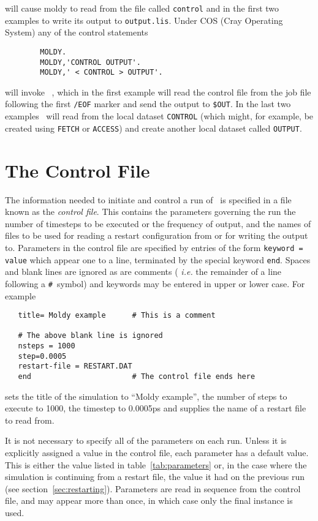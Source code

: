 will cause moldy to read from the file called \verb'control' and in
the first two examples to write its output to \verb'output.lis'.
Under COS (Cray Operating System) any of the control statements
\begin{verbatim}
        MOLDY.
        MOLDY,'CONTROL OUTPUT'.
        MOLDY,' < CONTROL > OUTPUT'.
\end{verbatim}
will invoke \moldy\ , which in the first example will read the control
file from the job file following the first \verb'/EOF' marker and send
the output to \verb'$OUT'.  In the last two examples
\moldy\  will read from the local dataset \verb'CONTROL' (which might, for
example, be created using \verb'FETCH' or \verb'ACCESS') and create
another local dataset called \verb'OUTPUT'.

\section{The Control File}
\label{sec:control}

The information needed to initiate and control a run of \moldy\  is
specified in a file known as the {\em control file}. This contains the
parameters governing the run \eg the number of timesteps to be
executed or the frequency of output, and the names of files to be used
\eg for reading a restart configuration from or for writing the
output to. Parameters in the control file are specified by entries of the form
\verb'keyword = value'
which appear one to a line, terminated by the special keyword
\verb'end'.  Spaces and blank lines are ignored as are comments ({\em
i.e.} the remainder of a line following a \verb'#'~symbol) and
keywords may be entered in upper or lower case. For example
\begin{verbatim}
   title= Moldy example      # This is a comment

   # The above blank line is ignored
   nsteps = 1000
   step=0.0005
   restart-file = RESTART.DAT
   end                       # The control file ends here
\end{verbatim}
sets the title of the simulation to ``Moldy example'', the number of
steps to execute to 1000, the timestep to 0.0005ps and supplies the
name of a restart file to read from.

It is not necessary to specify all of the parameters on each run.
Unless it is explicitly assigned a value in the control file, each
parameter has a default value.  This is either the value listed in
table~\ref{tab:parameters} or, in the case where the simulation is
continuing from a restart file, the value it had on the previous run
(see section~\ref{sec:restarting}). Parameters are read in sequence
from the control file, and may appear more than once, in which case
only the final instance is used.  

